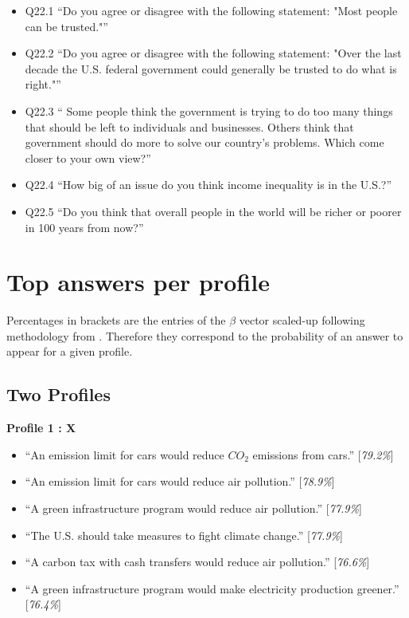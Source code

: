 \documentclass{article}
\begin{document}
\begin{itemize}
    \item Q22.1 ``Do you agree or disagree with the following statement: "Most people can be trusted."''
    \item Q22.2 ``Do you agree or disagree with the following statement: "Over the last decade the U.S. federal government could generally be trusted to do what is right."''
    \item Q22.3 `` Some people think the government is trying to do too many things that should be left to individuals and businesses. Others think that government should do more to solve our country's problems. Which come closer to your own view?''
    \item Q22.4 ``How big of an issue do you think income inequality is in the U.S.?''
    \item Q22.5 ``Do you think that overall people in the world will be richer or poorer in 100 years from now?''
\end{itemize}


\section{Top answers per profile}
Percentages in brackets are the entries of the $\beta$ vector scaled-up following methodology from \cite{draca2020polarized}. Therefore they correspond to the probability of an answer to appear for a given profile.
\subsection{Two Profiles}

\textbf{Profile 1 : X}

\begin{itemize}
    \item ``An emission limit for cars would reduce $CO_2$ emissions from cars.'' [\textit{79.2\%}]
    \item ``An emission limit for cars would reduce air pollution.'' [\textit{78.9\%}]
    \item ``A green infrastructure program would reduce air pollution.'' [\textit{77.9\%}]
    \item ``The U.S. should take measures to fight climate change.'' [\textit{77.9\%}]
    \item ``A carbon tax with cash transfers would reduce air pollution.'' [\textit{76.6\%}]
    \item ``A green infrastructure program would make electricity production greener.'' [\textit{76.4\%}]
\end{itemize}
\end{document}
